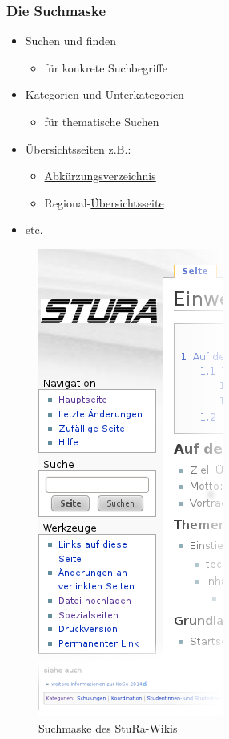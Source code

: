 \documentclass[handout]{beamer}   %
\begin{document}
\begin{frame}
  \frametitle{Die Suchmaske}

  \begin{itemize}[<+->]
    \item Suchen und finden
    \begin{itemize}
      \item für konkrete Suchbegriffe
    \end{itemize}
    \item Kategorien und Unterkategorien
    \begin{itemize}
      \item für thematische Suchen
    \end{itemize}
    \item Übersichtsseiten z.B.:
    \begin{itemize}
      \item \href{http://wiki.stura.htw-dresden.de/index.php/Kategorie:Abk\%C3\%BCrzung}{Abkürzungsverzeichnis}
      \item Regional-\href{http://food.the-empire.de/index.php/Hauptseite}{Übersichtsseite}
    \end{itemize}
    \item etc.
  \end{itemize}
  \begin{figure}
    \includegraphics[scale=0.25]{Stura-Wiki-Seitenleiste}
    \caption{Suchmaske des StuRa-Wikis}
    \label{fig:Suchmaske}
  \end{figure}
\end{frame}
\end{document}
